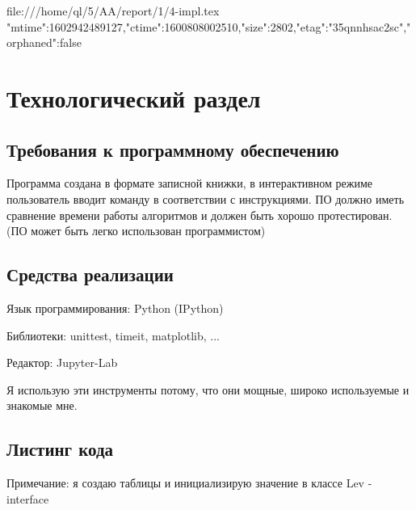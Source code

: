 file:///home/ql/5/AA/report/1/4-impl.tex {"mtime":1602942489127,"ctime":1600808002510,"size":2802,"etag":"35qnnhsac2sc","orphaned":false}
\chapter{Технологический раздел}
\label{cha:impl}

\section{Требования к программному обеспечению}

Программа создана в формате записной книжки, в интерактивном режиме пользователь вводит команду в соответствии с инструкциями.
ПО должно иметь сравнение времени работы алгоритмов и должен быть хорошо протестирован.
(ПО может быть легко использован программистом)


\section{Средства реализации}

Язык программирования: Python (IPython)

Библиотеки: unittest, timeit, matplotlib, ...

Редактор: Jupyter-Lab

Я использую эти инструменты потому, что они мощные, широко используемые и знакомые мне.


\section{Листинг кода}

Примечание: я создаю таблицы и инициализирую значение в классе
Lev - interface




\hbox{}



\hbox{}



\hbox{}



